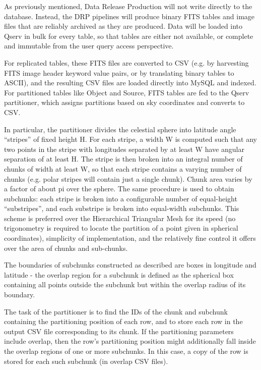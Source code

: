 \documentclass[DM,lsstdraft,toc]{lsstdoc}
\begin{document}
As previously mentioned, Data Release Production will not write directly
to the database. Instead, the DRP pipelines will produce binary FITS
tables and image files that are reliably archived as they are produced.
Data will be loaded into Qserv in bulk for every table, so that tables
are either not available, or complete and immutable from the user query
access perspective.

For replicated tables, these FITS files are converted to CSV (e.g. by
harvesting FITS image header keyword value pairs, or by translating
binary tables to ASCII), and the resulting CSV files are loaded directly
into MySQL and indexed. For partitioned tables like Object and Source,
FITS tables are fed to the Qserv partitioner, which assigns partitions
based on sky coordinates and converts to CSV.

In particular, the partitioner divides the celestial sphere into
latitude angle ``stripes'' of fixed height H. For each stripe, a width W
is computed such that any two points in the stripe with longitudes
separated by at least W have angular separation of at least H. The
stripe is then broken into an integral number of chunks of width at
least W, so that each stripe contains a varying number of chunks (e.g.
polar stripes will contain just a single chunk). Chunk area varies by a
factor of about pi over the sphere. The same procedure is used to obtain
subchunks: each stripe is broken into a configurable number of
equal-height ``substripes'', and each substripe is broken into
equal-width subchunks. This scheme is preferred over the Hierarchical
Triangular Mesh for its speed (no trigonometry is required to locate the
partition of a point given in spherical coordinates), simplicity of
implementation, and the relatively fine control it offers over the area
of chunks and sub-chunks.

The boundaries of subchunks constructed as described are boxes in
longitude and latitude - the overlap region for a subchunk is defined as
the spherical box containing all points outside the subchunk but within
the overlap radius of its boundary.

The task of the partitioner is to find the IDs of the chunk and subchunk
containing the partitioning position of each row, and to store each row
in the output CSV file corresponding to its chunk. If the partitioning
parameters include overlap, then the row's partitioning position might
additionally fall inside the overlap regions of one or more subchunks.
In this case, a copy of the row is stored for each such subchunk (in
overlap CSV files).
\end{document}
